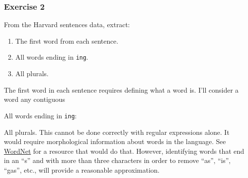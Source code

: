 \documentclass[]{book}
\newenvironment{Shaded}{\begin{snugshade}}{\end{snugshade}}
\newcommand{\CharTok}[1]{\textcolor[rgb]{0.31,0.60,0.02}{#1}}
\newcommand{\CommentTok}[1]{\textcolor[rgb]{0.56,0.35,0.01}{\textit{#1}}}
\newcommand{\KeywordTok}[1]{\textcolor[rgb]{0.13,0.29,0.53}{\textbf{#1}}}
\newcommand{\NormalTok}[1]{#1}
\newcommand{\OperatorTok}[1]{\textcolor[rgb]{0.81,0.36,0.00}{\textbf{#1}}}
\newcommand{\StringTok}[1]{\textcolor[rgb]{0.31,0.60,0.02}{#1}}
\providecommand{\tightlist}{%
  \setlength{\itemsep}{0pt}\setlength{\parskip}{0pt}}
\theoremstyle{plain}
\theoremstyle{remark}
\theoremstyle{definition}
\theoremstyle{definition}
\theoremstyle{definition}
\theoremstyle{remark}
\begin{document}
\hypertarget{exercise-2-35}{%
\subsubsection{Exercise 2}\label{exercise-2-35}}

From the Harvard sentences data, extract:

\begin{enumerate}
\def\labelenumi{\arabic{enumi}.}
\tightlist
\item
  The first word from each sentence.
\item
  All words ending in \texttt{ing}.
\item
  All plurals.
\end{enumerate}

The first word in each sentence requires defining what a word is. I'll
consider a word any contiguous

\begin{Shaded}
\end{Shaded}

All words ending in \texttt{ing}:

\begin{Shaded}
\end{Shaded}

All plurals. This cannot be done correctly with regular expressions
alone. It would require morphological information about words in the
language. See
\href{https://cran.r-project.org/web/packages/wordnet/index.html}{WordNet}
for a resource that would do that. However, identifying words that end
in an ``s'' and with more than three characters in order to remove
``as'', ``is'', ``gas'', etc., will provide a reasonable approximation.
\end{document}
